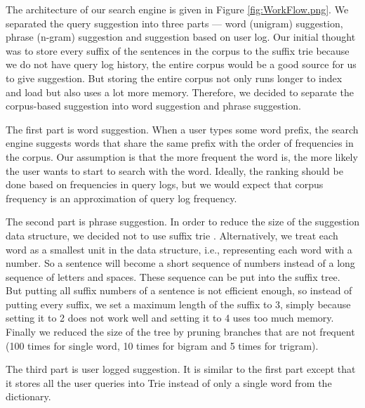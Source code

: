 \documentclass{article}
\begin{document}
The architecture of our search engine is given in Figure \ref{fig:WorkFlow.png}. We separated the query suggestion into three parts --- word (unigram) suggestion, phrase (n-gram) suggestion and suggestion based on user log. Our initial thought was to store every suffix of the sentences in the corpus to the suffix trie because we do not have query log history, the entire corpus would be a good source for us to give suggestion. But storing the entire corpus not only runs longer to index and load but also uses a lot more memory. Therefore, we decided to separate the corpus-based suggestion into word suggestion and phrase suggestion.

The first part is word suggestion. When a user types some word prefix, the search engine suggests words that share the same prefix with the order of frequencies in the corpus. Our assumption is that the more frequent the word is, the more likely the user wants to start to search with the word. Ideally, the ranking should be done based on frequencies in query logs, but we would expect that corpus frequency is an approximation of query log frequency.

The second part is phrase suggestion. In order to reduce the size of the suggestion data structure, we decided not to use suffix trie \cite{intro}. Alternatively, we treat each word as a smallest unit in the data structure, i.e., representing each word with a number. So a sentence will become a short sequence of numbers instead of a long sequence of letters and spaces. These sequence can be put into the suffix tree. But putting all suffix numbers of a sentence is not efficient enough, so instead of putting every suffix, we set a maximum length of the suffix to 3, simply because setting it to 2 does not work well and setting it to 4 uses too much memory. Finally we reduced the size of the tree by pruning branches that are not frequent (100 times for single word, 10 times for bigram and 5 times for trigram).

The third part is user logged suggestion. It is similar to the first part except that it stores all the user queries into Trie instead of only a single word from the dictionary.
\end{document}
